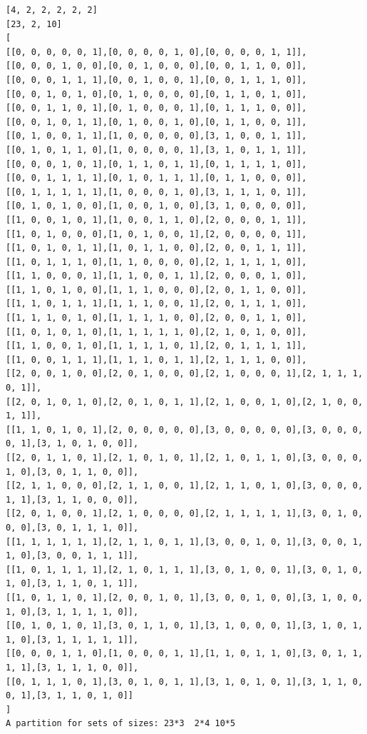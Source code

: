 \documentclass[final]{dmtcs-episciences}
\begin{document}
\begin{appendices}
\begin{verbatim} 
[4, 2, 2, 2, 2, 2]
[23, 2, 10]
[
[[0, 0, 0, 0, 0, 1],[0, 0, 0, 0, 1, 0],[0, 0, 0, 0, 1, 1]],
[[0, 0, 0, 1, 0, 0],[0, 0, 1, 0, 0, 0],[0, 0, 1, 1, 0, 0]],
[[0, 0, 0, 1, 1, 1],[0, 0, 1, 0, 0, 1],[0, 0, 1, 1, 1, 0]],
[[0, 0, 1, 0, 1, 0],[0, 1, 0, 0, 0, 0],[0, 1, 1, 0, 1, 0]],
[[0, 0, 1, 1, 0, 1],[0, 1, 0, 0, 0, 1],[0, 1, 1, 1, 0, 0]],
[[0, 0, 1, 0, 1, 1],[0, 1, 0, 0, 1, 0],[0, 1, 1, 0, 0, 1]],
[[0, 1, 0, 0, 1, 1],[1, 0, 0, 0, 0, 0],[3, 1, 0, 0, 1, 1]],
[[0, 1, 0, 1, 1, 0],[1, 0, 0, 0, 0, 1],[3, 1, 0, 1, 1, 1]],
[[0, 0, 0, 1, 0, 1],[0, 1, 1, 0, 1, 1],[0, 1, 1, 1, 1, 0]],
[[0, 0, 1, 1, 1, 1],[0, 1, 0, 1, 1, 1],[0, 1, 1, 0, 0, 0]],
[[0, 1, 1, 1, 1, 1],[1, 0, 0, 0, 1, 0],[3, 1, 1, 1, 0, 1]],
[[0, 1, 0, 1, 0, 0],[1, 0, 0, 1, 0, 0],[3, 1, 0, 0, 0, 0]],
[[1, 0, 0, 1, 0, 1],[1, 0, 0, 1, 1, 0],[2, 0, 0, 0, 1, 1]],
[[1, 0, 1, 0, 0, 0],[1, 0, 1, 0, 0, 1],[2, 0, 0, 0, 0, 1]],
[[1, 0, 1, 0, 1, 1],[1, 0, 1, 1, 0, 0],[2, 0, 0, 1, 1, 1]],
[[1, 0, 1, 1, 1, 0],[1, 1, 0, 0, 0, 0],[2, 1, 1, 1, 1, 0]],
[[1, 1, 0, 0, 0, 1],[1, 1, 0, 0, 1, 1],[2, 0, 0, 0, 1, 0]],
[[1, 1, 0, 1, 0, 0],[1, 1, 1, 0, 0, 0],[2, 0, 1, 1, 0, 0]],
[[1, 1, 0, 1, 1, 1],[1, 1, 1, 0, 0, 1],[2, 0, 1, 1, 1, 0]],
[[1, 1, 1, 0, 1, 0],[1, 1, 1, 1, 0, 0],[2, 0, 0, 1, 1, 0]],
[[1, 0, 1, 0, 1, 0],[1, 1, 1, 1, 1, 0],[2, 1, 0, 1, 0, 0]],
[[1, 1, 0, 0, 1, 0],[1, 1, 1, 1, 0, 1],[2, 0, 1, 1, 1, 1]],
[[1, 0, 0, 1, 1, 1],[1, 1, 1, 0, 1, 1],[2, 1, 1, 1, 0, 0]],
[[2, 0, 0, 1, 0, 0],[2, 0, 1, 0, 0, 0],[2, 1, 0, 0, 0, 1],[2, 1, 1, 1, 0, 1]],
[[2, 0, 1, 0, 1, 0],[2, 0, 1, 0, 1, 1],[2, 1, 0, 0, 1, 0],[2, 1, 0, 0, 1, 1]],
[[1, 1, 0, 1, 0, 1],[2, 0, 0, 0, 0, 0],[3, 0, 0, 0, 0, 0],[3, 0, 0, 0, 0, 1],[3, 1, 0, 1, 0, 0]],
[[2, 0, 1, 1, 0, 1],[2, 1, 0, 1, 0, 1],[2, 1, 0, 1, 1, 0],[3, 0, 0, 0, 1, 0],[3, 0, 1, 1, 0, 0]],
[[2, 1, 1, 0, 0, 0],[2, 1, 1, 0, 0, 1],[2, 1, 1, 0, 1, 0],[3, 0, 0, 0, 1, 1],[3, 1, 1, 0, 0, 0]],
[[2, 0, 1, 0, 0, 1],[2, 1, 0, 0, 0, 0],[2, 1, 1, 1, 1, 1],[3, 0, 1, 0, 0, 0],[3, 0, 1, 1, 1, 0]],
[[1, 1, 1, 1, 1, 1],[2, 1, 1, 0, 1, 1],[3, 0, 0, 1, 0, 1],[3, 0, 0, 1, 1, 0],[3, 0, 0, 1, 1, 1]],
[[1, 0, 1, 1, 1, 1],[2, 1, 0, 1, 1, 1],[3, 0, 1, 0, 0, 1],[3, 0, 1, 0, 1, 0],[3, 1, 1, 0, 1, 1]],
[[1, 0, 1, 1, 0, 1],[2, 0, 0, 1, 0, 1],[3, 0, 0, 1, 0, 0],[3, 1, 0, 0, 1, 0],[3, 1, 1, 1, 1, 0]],
[[0, 1, 0, 1, 0, 1],[3, 0, 1, 1, 0, 1],[3, 1, 0, 0, 0, 1],[3, 1, 0, 1, 1, 0],[3, 1, 1, 1, 1, 1]],
[[0, 0, 0, 1, 1, 0],[1, 0, 0, 0, 1, 1],[1, 1, 0, 1, 1, 0],[3, 0, 1, 1, 1, 1],[3, 1, 1, 1, 0, 0]],
[[0, 1, 1, 1, 0, 1],[3, 0, 1, 0, 1, 1],[3, 1, 0, 1, 0, 1],[3, 1, 1, 0, 0, 1],[3, 1, 1, 0, 1, 0]]
]
A partition for sets of sizes: 23*3  2*4 10*5
\end{verbatim}
\newpage


\end{appendices}
\end{document}
